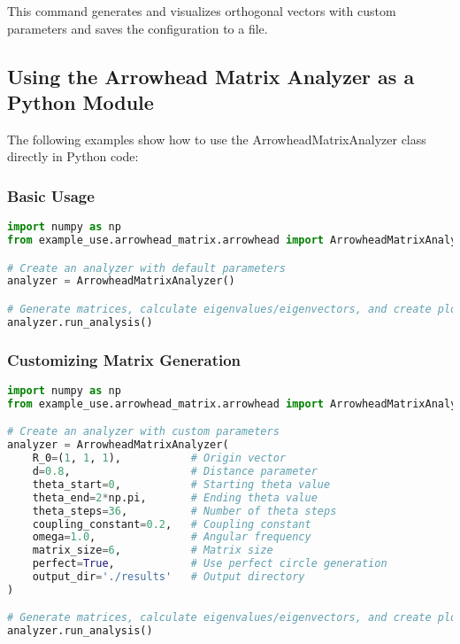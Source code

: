 This command generates and visualizes orthogonal vectors with custom parameters and saves the configuration to a file.

\subsection{Using the Arrowhead Matrix Analyzer as a Python Module}

The following examples show how to use the ArrowheadMatrixAnalyzer class directly in Python code:

\subsubsection{Basic Usage}

\begin{lstlisting}[language=Python]
import numpy as np
from example_use.arrowhead_matrix.arrowhead import ArrowheadMatrixAnalyzer

# Create an analyzer with default parameters
analyzer = ArrowheadMatrixAnalyzer()

# Generate matrices, calculate eigenvalues/eigenvectors, and create plots
analyzer.run_analysis()
\end{lstlisting}

\subsubsection{Customizing Matrix Generation}

\begin{lstlisting}[language=Python]
import numpy as np
from example_use.arrowhead_matrix.arrowhead import ArrowheadMatrixAnalyzer

# Create an analyzer with custom parameters
analyzer = ArrowheadMatrixAnalyzer(
    R_0=(1, 1, 1),           # Origin vector
    d=0.8,                   # Distance parameter
    theta_start=0,           # Starting theta value
    theta_end=2*np.pi,       # Ending theta value
    theta_steps=36,          # Number of theta steps
    coupling_constant=0.2,   # Coupling constant
    omega=1.0,               # Angular frequency
    matrix_size=6,           # Matrix size
    perfect=True,            # Use perfect circle generation
    output_dir='./results'   # Output directory
)

# Generate matrices, calculate eigenvalues/eigenvectors, and create plots
analyzer.run_analysis()
\end{lstlisting}

